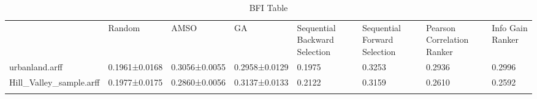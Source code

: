 \begin{table*}[h]
\caption{BFI Table}
\label{tbl:bfi}\begin{tabular}{llllllll}
\noalign{\smallskip}\hline\noalign{\smallskip}
&Random&AMSO&GA&Sequential Backward Selection&Sequential Forward Selection&Pearson Correlation Ranker&Info Gain Ranker\\\noalign{\smallskip}\hline
urbanland.arff&0.1961±0.0168&0.3056±0.0055&0.2958±0.0129&0.1975&0.3253&0.2936&0.2996\\
Hill_Valley_sample.arff&0.1977±0.0175&0.2860±0.0056&0.3137±0.0133&0.2122&0.3159&0.2610&0.2592\\
\noalign{\smallskip}\hline
\end{tabular}
\end{table*}